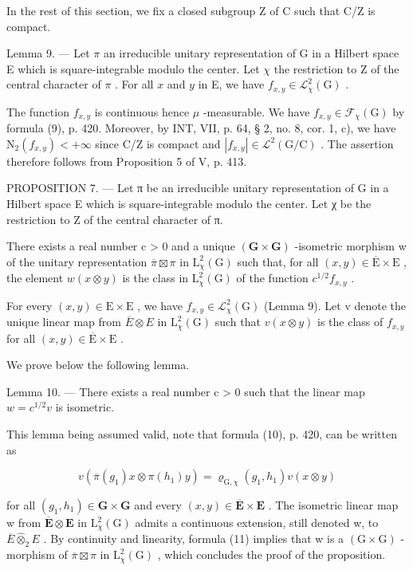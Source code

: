 In the rest of this section, we fix a closed subgroup Z of C such that C/Z is compact.

Lemma 9. --- Let \(\pi\) an irreducible unitary representation of G in a Hilbert space E which is square-integrable modulo the center. Let \(\chi\) the restriction to Z of the central character of \(\pi\) . For all \(x\) and \(y\) in E, we have \(f_{x,y} \in \mathcal{L}_{\chi}^{2}(\mathrm{G})\) .

 The function \(f_{x,y}\) is continuous hence \(\mu\) -measurable. We have \(f_{x,y} \in \mathcal{F}_{\chi}(\mathrm{G})\) by formula (9), p. 420. Moreover, by INT, VII, p. 64, § 2, no. 8, cor. 1, c), we have \(\mathrm{N}_{2}(f_{x,y}) < +\infty\) since C/Z is compact and \(|f_{x,y}| \in \mathcal{L}^{2}(\mathrm{G}/\mathrm{C})\) . The assertion therefore follows from Proposition 5 of V, p. 413.

PROPOSITION 7. --- Let π be an irreducible unitary representation of G in a Hilbert space E which is square-integrable modulo the center. Let χ be the restriction to Z of the central character of π.

There exists a real number c \textgreater{} 0 and a unique \((\mathbf{G} \times \mathbf{G})\) -isometric morphism w of the unitary representation \(\overline{\pi} \boxtimes \pi\) in \(\mathrm{L}_{\chi}^{2}(\mathrm{G})\) such that, for all \((x, y) \in \overline{\mathrm{E}} \times \mathrm{E}\) , the element \(w(x \otimes y)\) is the class in \(\mathrm{L}_{\chi}^{2}(\mathrm{G})\) of the function \(c^{1/2} f_{x,y}\) .

 For every \((x,y)\in\mathrm{E}\times\mathrm{E}\) , we have \(f_{x,y}\in\mathcal{L}_{\chi}^{2}(\mathrm{G})\) (Lemma 9). Let v denote the unique linear map from \(\overline{E}\otimes E\) in \(\mathrm{L}_{\chi}^{2}(\mathrm{G})\) such that \(v(x\otimes y)\) is the class of \(f_{x,y}\) for all \((x,y)\in\overline{\mathrm{E}}\times\mathrm{E}\) .

We prove below the following lemma.

Lemma 10. --- There exists a real number c \textgreater{} 0 such that the linear map \(w = c^{1/2}v\) is isometric.

This lemma being assumed valid, note that formula (10), p. 420, can be written as

\[
v (\overline {{\pi}} (g _ {1}) x \otimes \pi (h _ {1}) y) = \varrho_ {\mathrm{G}, \chi} (g _ {1}, h _ {1}) v (x \otimes y)\tag{11}
\]

 for all \((g_{1}, h_{1}) \in \mathbf{G} \times \mathbf{G}\) and every \((x, y) \in \overline{\mathbf{E}} \times \mathbf{E}\) . The isometric linear map w from \(\overline{\mathbf{E}} \otimes \mathbf{E}\) in \(\mathrm{L}_{\chi}^{2}(\mathrm{G})\) admits a continuous extension, still denoted w, to \(\overline{E} \widehat{\otimes}_{2} E\) . By continuity and linearity, formula (11) implies that w is a \((\mathrm{G} \times \mathrm{G})\) -morphism of \(\overline{\pi} \boxtimes \pi\) in \(\mathrm{L}_{\chi}^{2}(\mathrm{G})\) , which concludes the proof of the proposition.

